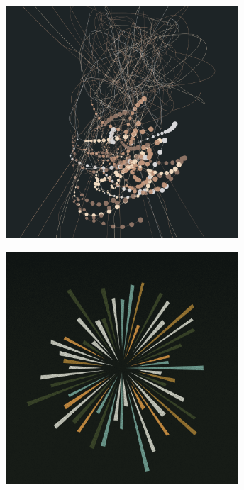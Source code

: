 \documentclass[11pt,twoside]{book}
\begin{document}
\begin{figure}[!ht]
\includegraphics[width=246pt]{copper-d2c2979f-1948-42d2-9da5-ebc72cf611f6.png}
\end{figure}
\newpage
{}
\fancyfoot[CE,CO]{\fontsize{10}{12}\selectfont \thepage}
\begin{figure}[!ht]
\includegraphics[width=246pt]{spy-3ff21414-509a-449e-8f52-01b2895b0bf2.png}
\end{figure}
\newpage
{}
\fancyfoot[CE,CO]{\fontsize{10}{12}\selectfont \thepage}
\end{document}
